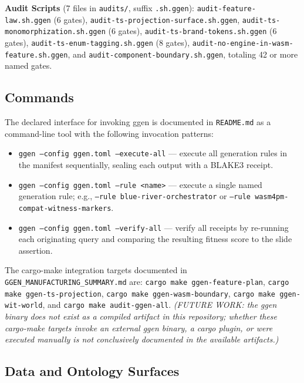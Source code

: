 \textbf{Audit Scripts} (7 files in \texttt{audits/}, suffix \texttt{.sh.ggen}):
\texttt{audit-feature-law.sh.ggen} (6 gates), \texttt{audit-ts-projection-surface.sh.ggen},
\texttt{audit-ts-monomorphization.sh.ggen} (6 gates), \texttt{audit-ts-brand-tokens.sh.ggen}
(6 gates), \texttt{audit-ts-enum-tagging.sh.ggen} (8 gates),
\texttt{audit-no-engine-in-wasm-feature.sh.ggen}, and \texttt{audit-component-boundary.sh.ggen},
totaling 42 or more named gates.

\subsection{Commands}
\label{sec:ggen-implementation-commands}

The declared interface for invoking ggen is documented in \texttt{README.md} as a command-line
tool with the following invocation patterns:

\begin{itemize}
  \item \texttt{ggen --config ggen.toml --execute-all} --- execute all generation rules in the
    manifest sequentially, sealing each output with a BLAKE3 receipt.
  \item \texttt{ggen --config ggen.toml --rule <name>} --- execute a single named generation
    rule; e.g., \texttt{--rule blue-river-orchestrator} or \texttt{--rule wasm4pm-compat-witness-markers}.
  \item \texttt{ggen --config ggen.toml --verify-all} --- verify all receipts by re-running each
    originating query and comparing the resulting fitness score to the slide assertion.
\end{itemize}

The cargo-make integration targets documented in \texttt{GGEN\_MANUFACTURING\_SUMMARY.md} are:
\texttt{cargo make ggen-feature-plan}, \texttt{cargo make ggen-ts-projection},
\texttt{cargo make ggen-wasm-boundary}, \texttt{cargo make ggen-wit-world}, and
\texttt{cargo make audit-ggen-all}. \textit{(FUTURE WORK: the ggen binary does not exist as a
compiled artifact in this repository; whether these cargo-make targets invoke an external ggen
binary, a cargo plugin, or were executed manually is not conclusively documented in the available
artifacts.)}

\subsection{Data and Ontology Surfaces}
\label{sec:ggen-implementation-data}

